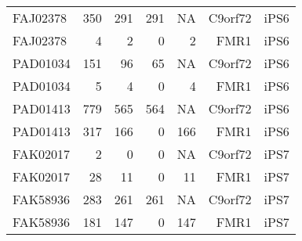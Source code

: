 \begin{longtable}{lrrrrrr}
FAJ02378 & 350   & 291   & 291       & NA       & C9orf72 & iPS6    \\
FAJ02378 & 4     & 2     & 0         & 2        & FMR1    & iPS6    \\
PAD01034 & 151   & 96    & 65        & NA       & C9orf72 & iPS6    \\
PAD01034 & 5     & 4     & 0         & 4        & FMR1    & iPS6    \\
PAD01413 & 779   & 565   & 564       & NA       & C9orf72 & iPS6    \\
PAD01413 & 317   & 166   & 0         & 166      & FMR1    & iPS6    \\
FAK02017 & 2     & 0     & 0         & NA       & C9orf72 & iPS7    \\
FAK02017 & 28    & 11    & 0         & 11       & FMR1    & iPS7    \\
FAK58936 & 283   & 261   & 261       & NA       & C9orf72 & iPS7    \\
FAK58936 & 181   & 147   & 0         & 147      & FMR1    & iPS7   
\end{longtable}




